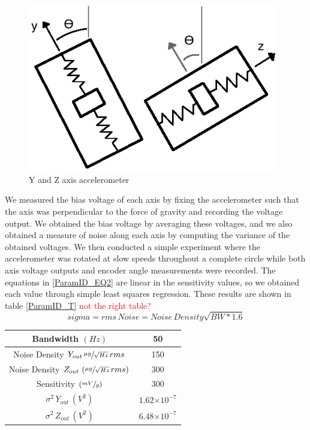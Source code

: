 \documentclass{article}
\newcommand{\xxx}[1]{\textcolor{red}{#1}}
\theoremstyle{plain}
\theoremstyle{definition}
\theoremstyle{remark}
\providecommand{\e}[1]{\ensuremath{\times 10^{#1}}}
\begin{document}
\begin{figure}
\begin{center}
\includegraphics[width = 11cm]{Accelerometer_Cartoon.png}
\caption{Y and Z axis accelerometer}
\label{Accel_cartoon}
\end{center}
\end{figure}

We measured the bias voltage of each axis by fixing the accelerometer such that the axis was perpendicular to the force of gravity and recording the voltage output.  We obtained the bias voltage by averaging these voltages, and we also obtained a measure of noise along each axis by computing the variance of the obtained voltages.  We then conducted a simple experiment where the accelerometer was rotated at slow speeds throughout a complete circle while both axis voltage outputs and encoder angle measurements were recorded.  The equations in \ref{ParamID_EQ2} are linear in the sensitivity values, so we obtained each value through simple least squares regression.  These results are shown in table \ref{ParamID_T} \xxx{not the right table?} \\


$$sigma = rms \, Noise = Noise \, Density \sqrt{BW * 1.6} $$

\begin{table}
\begin{center}
	\begin{tabular}{|c|c|}
		\hline
		Bandwidth $(Hz)$ & 50 \\ \hline
		Noise Density $Y_{out} \, \sfrac{\mu g}{\sqrt{Hz}} \, rms$ & 150 \\ \hline
		Noise Density $Z_{out} \, \left(\sfrac{\mu g}{\sqrt{Hz}} \, rms\right)$ & 300 \\ \hline
		Sensitivity $\left( \sfrac{mV}{g} \right)$ & 300 \\ \hline
		$\sigma^2 \,Y_{out} \, (V^2)$ & $1.62 \e{-7}$ \\ \hline
		$\sigma^2 \,Z_{out} \, (V^2)$ & $6.48 \e{-7}$ \\ \hline
		
	\end{tabular}
\label{ParamID_AccelT}
\end{center}
\end{table}
\end{document}
